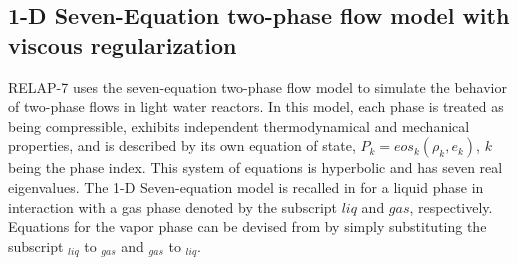 \documentclass{mc2015}
\begin{document}
\subsection{1-D Seven-Equation two-phase flow model with viscous regularization}\label{sec:two-phase-model}
%
RELAP-7 \cite{Berry_Peterson_2014} uses the seven-equation two-phase flow model \cite{SEM} to simulate the behavior of two-phase flows in light water reactors. In this model, each phase is treated as being compressible, exhibits independent thermodynamical and mechanical properties, and is described by its own equation of state, $P_k = eos_k(\rho_k,e_k)$, $k$ being the phase index. This system of equations is hyperbolic and has seven real eigenvalues. The 1-D Seven-equation model is recalled in  for a liquid phase in interaction with a gas phase denoted by the subscript $liq$ and $gas$, respectively. Equations for the vapor phase can be devised from  by simply substituting the subscript $_{liq}$ to $_{gas}$ and $_{gas}$ to $_{liq}$.
%
%
\end{document}
